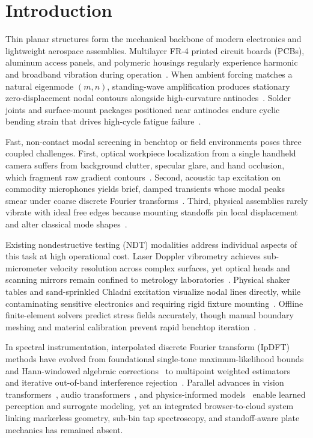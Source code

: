 \documentclass[journal]{IEEEtran}
\begin{document}
\section{Introduction}
Thin planar structures form the mechanical backbone of modern electronics and lightweight aerospace assemblies. Multilayer FR-4 printed circuit boards (PCBs), aluminum access panels, and polymeric housings regularly experience harmonic and broadband vibration during operation~\cite{steinberg2000vibration}. When ambient forcing matches a natural eigenmode $(m, n)$, standing-wave amplification produces stationary zero-displacement nodal contours alongside high-curvature antinodes~\cite{chladni1787entdeckungen,leissa1969vibration}. Solder joints and surface-mount packages positioned near antinodes endure cyclic bending strain that drives high-cycle fatigue failure~\cite{basquin1910exponential,steinberg2000vibration}.

Fast, non-contact modal screening in benchtop or field environments poses three coupled challenges. First, optical workpiece localization from a single handheld camera suffers from background clutter, specular glare, and hand occlusion, which fragment raw gradient contours~\cite{otsu1979threshold,canny1986computational}. Second, acoustic tap excitation on commodity microphones yields brief, damped transients whose modal peaks smear under coarse discrete Fourier transforms~\cite{harris1978windows,smith1987parshl}. Third, physical assemblies rarely vibrate with ideal free edges because mounting standoffs pin local displacement and alter classical mode shapes~\cite{timoshenko1959theory,ewins2000modal}.

Existing nondestructive testing (NDT) modalities address individual aspects of this task at high operational cost. Laser Doppler vibrometry achieves sub-micrometer velocity resolution across complex surfaces, yet optical heads and scanning mirrors remain confined to metrology laboratories~\cite{castellini2006laser}. Physical shaker tables and sand-sprinkled Chladni excitation visualize nodal lines directly, while contaminating sensitive electronics and requiring rigid fixture mounting~\cite{ewins2000modal}. Offline finite-element solvers predict stress fields accurately, though manual boundary meshing and material calibration prevent rapid benchtop iteration~\cite{worden2007application,farrar2007introduction}.

In spectral instrumentation, interpolated discrete Fourier transform (IpDFT) methods have evolved from foundational single-tone maximum-likelihood bounds~\cite{rife1974single} and Hann-windowed algebraic corrections~\cite{jain1979high,grandke1983interpolation} to multipoint weighted estimators~\cite{agrez2002weighted,belega2008frequency,belega2010accuracy} and iterative out-of-band interference rejection~\cite{wang2022novel,song2022fast,garciaveloso2024computationally}. Parallel advances in vision transformers~\cite{fang2021yolos,mehta2022mobilevit,oquab2023dinov2}, audio transformers~\cite{gong2021ast}, and physics-informed models~\cite{raissi2019pinns} enable learned perception and surrogate modeling, yet an integrated browser-to-cloud system linking markerless geometry, sub-bin tap spectroscopy, and standoff-aware plate mechanics has remained absent.
\end{document}
